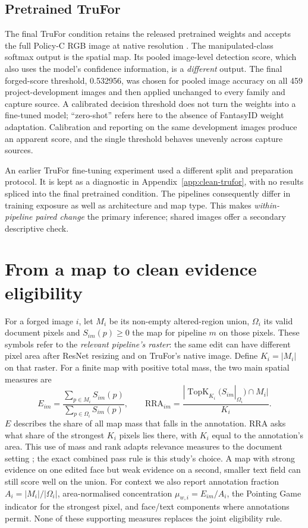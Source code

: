 \subsection{Pretrained TruFor}

The final TruFor condition retains the released pretrained weights and accepts the full Policy-C RGB image at native resolution \citep{guillaro2023trufor}. The manipulated-class softmax output is the spatial map. Its pooled image-level detection score, which also uses the model's confidence information, is a \emph{different} output. The final forged-score threshold, 0.532956, was chosen for pooled image accuracy on all 459 project-development images and then applied unchanged to every family and capture source. A calibrated decision threshold does not turn the weights into a fine-tuned model; ``zero-shot'' refers here to the absence of FantasyID weight adaptation. Calibration and reporting on the same development images produce an apparent score, and the single threshold behaves unevenly across capture sources.

An earlier TruFor fine-tuning experiment used a different split and preparation protocol. It is kept as a diagnostic in Appendix~\ref{app:clean-trufor}, with no results spliced into the final pretrained condition. The pipelines consequently differ in training exposure as well as architecture and map type. This makes \emph{within-pipeline paired change} the primary inference; shared images offer a secondary descriptive check.

\section{From a map to clean evidence eligibility}
\label{sec:method-evidence}

For a forged image $i$, let $M_i$ be its non-empty altered-region union, $\Omega_i$ its valid document pixels and $S_{im}(p)\geq0$ the map for pipeline $m$ on those pixels. These symbols refer to the \emph{relevant pipeline's raster}: the same edit can have different pixel area after ResNet resizing and on TruFor's native image. Define $K_i=|M_i|$ on that raster. For a finite map with positive total mass, the two main spatial measures are
\begin{equation}
E_{im}=\frac{\sum_{p\in M_i}S_{im}(p)}{\sum_{p\in\Omega_i}S_{im}(p)},
\qquad
\mathrm{RRA}_{im}=\frac{|\operatorname{TopK}_{K_i}(S_{im}|_{\Omega_i})\cap M_i|}{K_i}.
\label{eq:method-spatial}
\end{equation}
$E$ describes the share of all map mass that falls in the annotation. RRA asks what share of the strongest $K_i$ pixels lies there, with $K_i$ equal to the annotation's area. This use of mass and rank adapts relevance measures to the document setting \citep{arras2022clevrxai}; the exact combined pass rule is this study's choice. A map with strong evidence on one edited face but weak evidence on a second, smaller text field can still score well on the union. For context we also report annotation fraction $A_i=|M_i|/|\Omega_i|$, area-normalised concentration $\mu_{w,i}=E_{im}/A_i$, the Pointing Game indicator for the strongest pixel, and face/text components where annotations permit. None of these supporting measures replaces the joint eligibility rule.

